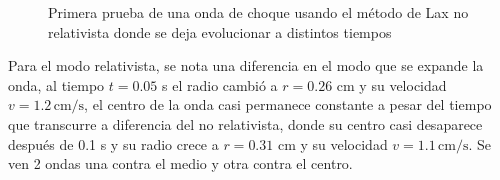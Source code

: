 \documentclass[12pt,a4paper]{book}
\begin{document}
\begin{figure}[H]
\caption{Primera prueba de una onda de choque usando el método de Lax no relativista donde se deja evolucionar a distintos tiempos} \label{fig:Lax-newtoniano-prueba1}
\end{figure}

Para el modo relativista, se nota una diferencia en el modo que se expande la onda, al tiempo $t = 0.05$ s el radio cambió a $r = 0.26 $ cm y su velocidad $v = 1.2 \, \mathrm{cm}/\mathrm{s}$, el centro de la onda casi permanece constante a pesar del tiempo que transcurre a diferencia del no relativista, donde su centro casi desaparece después de 0.1 s y su radio crece a $r = 0.31$ cm y su velocidad $v = 1.1 \, \mathrm{cm}/\mathrm{s}$. Se ven 2 ondas una contra el medio y otra contra el centro. 


\end{document}
